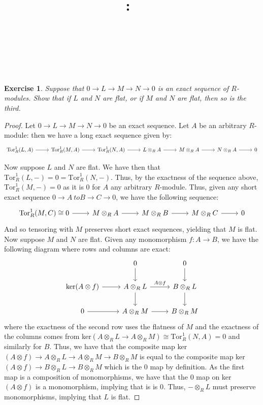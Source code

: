 \documentclass{article}
\title{
    \vspace{2in}
    \textmd{\textbf{\hmwkClass:\ \hmwkTitle}}\\
    \vspace{0.1in}
    \textmd{\hmwkDueDate} \\
    \vspace{0.2in}\large{\textit{\hmwkClassInstructor\  }}
    \vspace{2in}
}
\author{\hmwkAuthorName}
\date{}
\newcommand{\iso}{\cong}
\newtheorem{exercise}{Exercise}
\begin{document}
\maketitle
\newpage
\begin{exercise}
  Suppose that $0 \to L \to M \to N  \to 0$ is an exact sequence of $R$-modules. Show that if $L$ and $N$ are flat, or if $M$ and $N$ are flat, then so is the third.
\end{exercise}
\begin{proof}
  Let $0 \to L \to M \to N \to 0$ be an exact sequence. Let $A$ be an arbitrary $R$-module: then we have a long exact sequence given by:
  \[
  \begin{tikzcd}
    \text{Tor}_{R}^{1}(L,A) \arrow[r] & \text{Tor}_{R}^{1}(M,A) \arrow[r] & \text{Tor}_{R}^{1}(N,A) \arrow[r] & L \otimes_{R} A \arrow[r] & M \otimes_{R} A \arrow[r] & N \otimes_{R} A \arrow[r] & 0   
  \end{tikzcd}
\]

Now suppose $L$ and $N$ are flat. We have then that $\text{Tor}_{R}^{1}(L, -) = 0 = \text{Tor}_{R}^{1}(N,-)$. Thus, by the exactness of the sequence above, $\text{Tor}_{R}^{1}(M, -) = 0$ as it is $0$ for $A$ any arbitrary $R$-module. Thus, given any short exact sequence $0 \to A \ to B \to C \to 0$, we have the following sequence:
\[
    \begin{tikzcd}
    \text{Tor}_{R}^{1}(M,C) \iso 0 \arrow[r] & M \otimes_{R} A \arrow[r] & M \otimes_{R} B \arrow[r] & M \otimes_{R} C \arrow[r] & 0   
  \end{tikzcd}
\]
And so tensoring with $M$ preserves short exact sequences, yielding that $M$ is flat.  Now suppose $M$ and $N$ are flat. Given any monomorphism $f: A \to B$, we have the following diagram where rows and columns are exact:
\[
  \begin{tikzcd}
                       & 0 \arrow[d]                       & 0 \arrow[d]            \\
\text{ker} (A \otimes f) \arrow[r] & A \otimes_R L \arrow[r, "A \otimes f"] \arrow[d] & B\otimes_R L \arrow[d] \\
0 \arrow[r]            & A \otimes_R M \arrow[r]           & B \otimes_R M         
\end{tikzcd}
\]
where the exactness of the second row uses the flatness of $M$ and the exactness of the columns comes from ker$(A\otimes_{R} L \to A \otimes_{R} M) \iso \text{Tor}_{R}^{1}(N, A) = 0$ and similarly for $B$. Thus, we have that the composite map ker$(A\otimes f) \to A \otimes_{R} L \to A \otimes_{R} M \to B \otimes_{R} M$ is equal to the composite map ker$(A \otimes f) \to B \otimes_{R} L \to B \otimes_{R} M$ which is the $0$ map by definition. As the first map is a composition of monomorphisms, we have that the $0$ map on ker$(A \otimes f)$ is a monomorphism, implying that is is $0$. Thus, $- \otimes_{R} L$ must preserve monomorphisms, implying that $L$ is flat.   
\end{proof}
\end{document}
